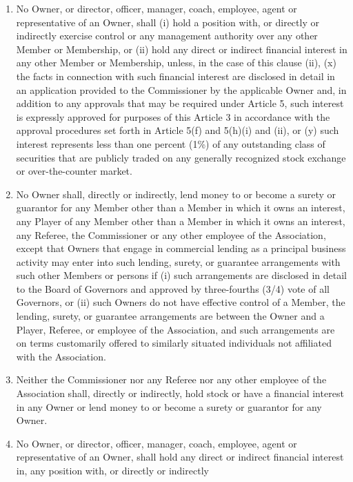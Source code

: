 \documentclass[]{book}
\providecommand{\tightlist}{%
  \setlength{\itemsep}{0pt}\setlength{\parskip}{0pt}}
\theoremstyle{definition}
\theoremstyle{definition}
\theoremstyle{definition}
\theoremstyle{remark}
\begin{document}
\begin{enumerate}
\def\labelenumi{(\alph{enumi})}
\tightlist
\item
  No Owner, or director, officer, manager, coach, employee, agent or
  representative of an Owner, shall (i) hold a position with, or
  directly or indirectly exercise control or any management authority
  over any other Member or Membership, or (ii) hold any direct or
  indirect financial interest in any other Member or Membership, unless,
  in the case of this clause (ii), (x) the facts in connection with such
  financial interest are disclosed in detail in an application provided
  to the Commissioner by the applicable Owner and, in addition to any
  approvals that may be required under Article 5, such interest is
  expressly approved for purposes of this Article 3 in accordance with
  the approval procedures set forth in Article 5(f) and 5(h)(i) and
  (ii), or (y) such interest represents less than one percent (1\%) of
  any outstanding class of securities that are publicly traded on any
  generally recognized stock exchange or over-the-counter market.
\item
  No Owner shall, directly or indirectly, lend money to or become a
  surety or guarantor for any Member other than a Member in which it
  owns an interest, any Player of any Member other than a Member in
  which it owns an interest, any Referee, the Commissioner or any other
  employee of the Association, except that Owners that engage in
  commercial lending as a principal business activity may enter into
  such lending, surety, or guarantee arrangements with such other
  Members or persons if (i) such arrangements are disclosed in detail to
  the Board of Governors and approved by three-fourths (3/4) vote of all
  Governors, or (ii) such Owners do not have effective control of a
  Member, the lending, surety, or guarantee arrangements are between the
  Owner and a Player, Referee, or employee of the Association, and such
  arrangements are on terms customarily offered to similarly situated
  individuals not affiliated with the Association.
\item
  Neither the Commissioner nor any Referee nor any other employee of the
  Association shall, directly or indirectly, hold stock or have a
  financial interest in any Owner or lend money to or become a surety or
  guarantor for any Owner.
\item
  No Owner, or director, officer, manager, coach, employee, agent or
  representative of an Owner, shall hold any direct or indirect
  financial interest in, any position with, or directly or indirectly

\end{enumerate}
\end{document}
